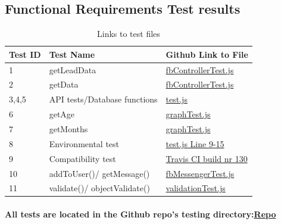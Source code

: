 \documentclass{article}
\begin{document}
\subsection{Functional Requirements Test results}
\begin{table}[H]
\centering
\label{link_table}
\begin{tabular}{|l|l|l|}
\hline
Test ID    & Test Name   & Github Link to File \\ \hline \hline
1          & getLeadData &  \href{https://github.com/QuintonWeenink/ValknutSolutions/blob/develop/test/integration/fbControllerTest.js}{fbControllerTest.js}         \\ \hline
2          & getData  &  \href{https://github.com/QuintonWeenink/ValknutSolutions/blob/develop/test/integration/fbControllerTest.js}{fbControllerTest.js}       \\ \hline
3,4,5      & API tests/Database functions & \href{https://github.com/QuintonWeenink/ValknutSolutions/blob/develop/test/api/test.js}{test.js}         \\ \hline
6          & getAge    & \href{https://github.com/QuintonWeenink/ValknutSolutions/blob/develop/test/graphTest.js}{graphTest.js} \\ \hline
7          & getMonths  & \href{https://github.com/QuintonWeenink/ValknutSolutions/blob/develop/test/graphTest.js}{graphTest.js} \\ \hline 
8          &  Environmental test  & \href{https://github.com/QuintonWeenink/ValknutSolutions/blob/develop/test/test.js}{test.js Line 9-15}\\ \hline
9		   & Compatibility test & \href{https://travis-ci.com/QuintonWeenink/ValknutSolutions/builds/30866212}{Travis CI build nr 130} \\ \hline
10		   & addToUser()/ getMessage() & \href{https://github.com/QuintonWeenink/ValknutSolutions/blob/develop/test/fbMessengerTest.js}{fbMessengerTest.js}   \\ \hline
11		   & validate()/ objectValidate() & \href{https://github.com/QuintonWeenink/ValknutSolutions/blob/develop/test/validationTest.js}{validationTest.js}   \\ \hline
\end{tabular}
\caption{Links to test files}
\end{table}
\paragraph{All tests are located in the Github repo's testing directory:\href{https://github.com/QuintonWeenink/ValknutSolutions}{Repo}}
\end{document}
